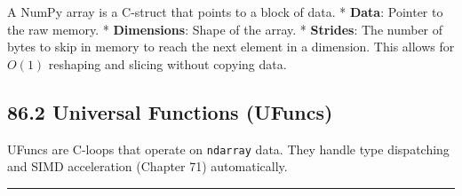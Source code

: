 A NumPy array is a C-struct that points to a block of data. *
\textbf{Data}: Pointer to the raw memory. * \textbf{Dimensions}: Shape
of the array. * \textbf{Strides}: The number of bytes to skip in memory
to reach the next element in a dimension. This allows for \(O(1)\)
reshaping and slicing without copying data.

\hypertarget{universal-functions-ufuncs}{%
\subsection{86.2 Universal Functions
(UFuncs)}\label{universal-functions-ufuncs}}

UFuncs are C-loops that operate on \passthrough{\lstinline!ndarray!}
data. They handle type dispatching and SIMD acceleration (Chapter 71)
automatically.

\begin{center}\rule{0.5\linewidth}{0.5pt}\end{center}
